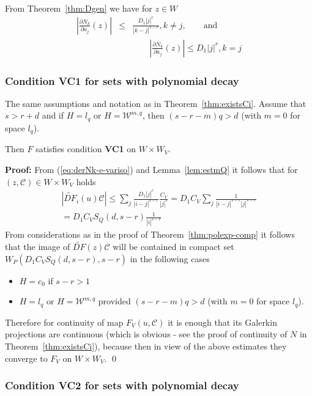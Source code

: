 From Theorem~\ref{thm:Dgen} we have for $z \in W$
\begin{eqnarray}
   \left|\frac{\partial N_k}{\partial a_j}(z)\right| &\leq& \frac{D_1 |j|^r}{|k-j|^{s-r}},  k \neq j, \qquad \mbox{and} \nonumber \\
     & &  \qquad \left|\frac{\partial N_k}{\partial a_j}(z)\right|  \leq D_1|j|^r, k=j \label{eq:derNk-e-variso}
\end{eqnarray}

\subsubsection{Condition \textbf{VC1} for sets with polynomial decay}
\begin{lemma}
The same assumptions and notation as in Theorem~\ref{thm:existsCi}.  Assume that $s>r+d$ and if $H=l_q$ or $H=\mathcal{W}^{m,q}$, then $(s-r - m)q>d$ (with $m=0$ for space $l_q$).

Then $F$ satisfies condition {\bf VC1} on $W \times W_V$.
\end{lemma}
\textbf{Proof:}
From (\ref{eq:derNk-e-variso}) and  Lemma~\ref{lem:estmQ} it follows that for $(z,\mathcal{C}) \in W\times W_V$ holds
\begin{eqnarray*}
  |\widetilde{DF}_i(u) \mathcal{C}| \leq \sum_j \frac{D_1|j|^r}{|i-j|^{s-r}} \frac{C_V}{|j|^s}=D_1 C_V\sum_j \frac{1}{|i-j|^{s-r}|j|^{s-r}}\\
  =D_1C_VS_Q(d,s-r)\frac{1}{|i|^{s-r}}
\end{eqnarray*}
From considerations as in the proof of Theorem~\ref{thm:polexp-comp} it follows that  the image of $\widetilde{DF}(z) \mathcal{C}$ will be contained in compact set $W_P(D_1C_VS_Q(d,s-r),s-r)$ in the following cases
\begin{itemize}
\item $H=c_0$ if $s-r >1$
\item $H=l_q$ or $H=\mathcal{W}^{m,q}$ provided $(s-r - m)q>d$ (with $m=0$ for space $l_q$).
\end{itemize}
Therefore for continuity of map $F_V(u,\mathcal{C})$ it is enough that its Galerkin projections are continuous (which is obvious - see the proof of continuity of $N$
in Theorem~\ref{thm:existsCi}), because then in view of the above
estimates they converge to $F_V$ on $W \times W_V$.
\qed

\subsubsection{Condition \textbf{VC2} for sets with polynomial decay}

